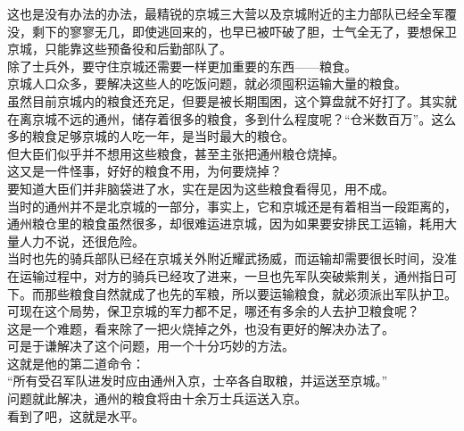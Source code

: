 \begin{multicols}{\theparacolNo}
这也是没有办法的办法，最精锐的京城三大营以及京城附近的主力部队已经全军覆没，剩下的寥寥无几，即使逃回来的，也早已被吓破了胆，士气全无了，要想保卫京城，只能靠这些预备役和后勤部队了。\\

除了士兵外，要守住京城还需要一样更加重要的东西——粮食。\\

京城人口众多，要解决这些人的吃饭问题，就必须囤积运输大量的粮食。\\

虽然目前京城内的粮食还充足，但要是被长期围困，这个算盘就不好打了。其实就在离京城不远的通州，储存着很多的粮食，多到什么程度呢？“仓米数百万”。这么多的粮食足够京城的人吃一年，是当时最大的粮仓。\\

但大臣们似乎并不想用这些粮食，甚至主张把通州粮仓烧掉。\\

这又是一件怪事，好好的粮食不用，为何要烧掉？\\

要知道大臣们并非脑袋进了水，实在是因为这些粮食看得见，用不成。\\

当时的通州并不是北京城的一部分，事实上，它和京城还是有着相当一段距离的，通州粮仓里的粮食虽然很多，却很难运进京城，因为如果要安排民工运输，耗用大量人力不说，还很危险。\\

当时也先的骑兵部队已经在京城关外附近耀武扬威，而运输却需要很长时间，没准在运输过程中，对方的骑兵已经攻了进来，一旦也先军队突破紫荆关，通州指日可下。而那些粮食自然就成了也先的军粮，所以要运输粮食，就必须派出军队护卫。\\

可现在这个局势，保卫京城的军力都不足，哪还有多余的人去护卫粮食呢？\\

这是一个难题，看来除了一把火烧掉之外，也没有更好的解决办法了。\\

可是于谦解决了这个问题，用一个十分巧妙的方法。\\

这就是他的第二道命令：\\

“所有受召军队进发时应由通州入京，士卒各自取粮，并运送至京城。”\\

问题就此解决，通州的粮食将由十余万士兵运送入京。\\

看到了吧，这就是水平。\\


\end{multicols}
